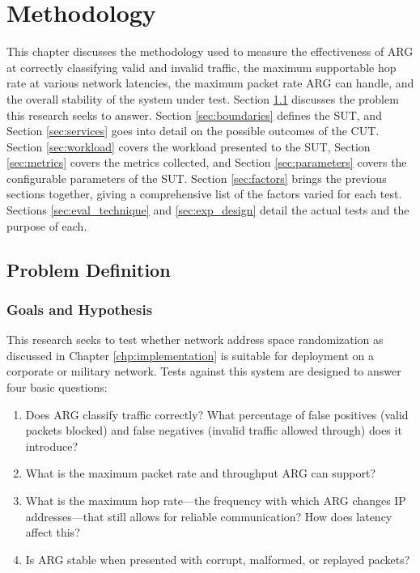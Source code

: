 \chapter{Methodology}
\label{chp:methodology}

\par This chapter discusses the methodology used to measure the effectiveness of \ac{ARG} at correctly classifying valid and invalid traffic, the maximum supportable hop rate at various network latencies, the maximum packet rate \ac{ARG} can handle, and the overall stability of the system under test. Section \ref{sec:problem_def} discusses the problem this research seeks to answer. Section \ref{sec:boundaries} defines the \ac{SUT}, and Section \ref{sec:services} goes into detail on the possible outcomes of the \ac{CUT}. Section \ref{sec:workload} covers the workload presented to the \ac{SUT}, Section \ref{sec:metrics} covers the metrics collected, and Section \ref{sec:parameters} covers the configurable parameters of the \ac{SUT}. Section \ref{sec:factors} brings the previous sections together, giving a comprehensive list of the factors varied for each test. Sections \ref{sec:eval_technique} and \ref{sec:exp_design} detail the actual tests and the purpose of each.

\section{Problem Definition}
\label{sec:problem_def}
\subsection{Goals and Hypothesis}
\label{sec:goals}
\par This research seeks to test whether network address space randomization as discussed in Chapter \ref{chp:implementation} is suitable for deployment on a corporate or military network. Tests against this system are designed to answer four basic questions:

\begin{enumerate}
\item Does \ac{ARG} classify traffic correctly? What percentage of false positives (valid packets blocked) and false negatives (invalid traffic allowed through) does it introduce?
\item What is the maximum packet rate and throughput \ac{ARG} can support?
\item What is the maximum hop rate---the frequency with which \ac{ARG} changes \ac{IP} addresses---that still allows for reliable communication? How does latency affect this?
\item Is \ac{ARG} stable when presented with corrupt, malformed, or replayed packets?
\end{enumerate}

